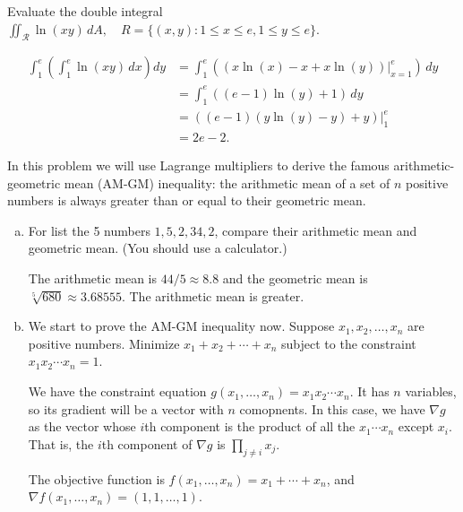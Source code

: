 \begin{problem}
  Evaluate the double integral $\iint_\mathcal R \ln(xy)\,dA,\quad R=\{(x,y):1\leq x\leq e,1\leq y\leq e\}$.
\end{problem}
\begin{solution}
  \[\begin{split}
    \int_1^e\left(\int_1^e\ln(xy)\,dx\right)dy &= \int_1^e \left((x\ln(x)-x+x\ln(y))\Big|_{x=1}^{e}\right)\,dy\\
    &= \int_1^e((e-1)\ln(y)+1)\,dy\\
    &=((e-1)(y\ln(y)-y)+y)\Big|_1^e\\
    &= 2e-2.
  \end{split}\]
\end{solution}

\begin{problem}
  In this problem we will use Lagrange multipliers to derive the famous arithmetic-geometric mean (AM-GM) inequality: the arithmetic mean of a set of $n$ positive numbers is always greater than or equal to their geometric mean.
  \begin{enumerate}[(a)]
    \item For list the 5 numbers $1,5,2,34,2$, compare their arithmetic mean and geometric mean. (You should use a calculator.)
    \begin{solution}
      The arithmetic mean is $44/5\approx 8.8$ and the geometric mean is $\sqrt[5]{680}\approx 3.68555$. The arithmetic mean is greater.
    \end{solution}
    \item We start to prove the AM-GM inequality now. Suppose $x_1,x_2,\dots,x_n$ are positive numbers. Minimize $x_1+x_2+\cdots+x_n$ subject to the constraint $x_1x_2\cdots x_n=1$.
    \begin{solution}
      We have the constraint equation $g(x_1,\dots,x_n)=x_1x_2\cdots x_n$. It has $n$ variables, so its gradient will be a vector with $n$ comopnents. In this case, we have $\nabla g$ as the vector whose $i$th component is the product of all the $x_1\cdots x_n$ except $x_i$. That is, the $i$th component of $\nabla g$ is $\prod_{j\neq i}x_j$.

      The objective function is $f(x_1,\dots,x_n)=x_1+\cdots+x_n$, and $\nabla f(x_1,\dots,x_n)=(1,1,\dots,1)$.


\end{solution}
\end{enumerate}
\end{problem}
